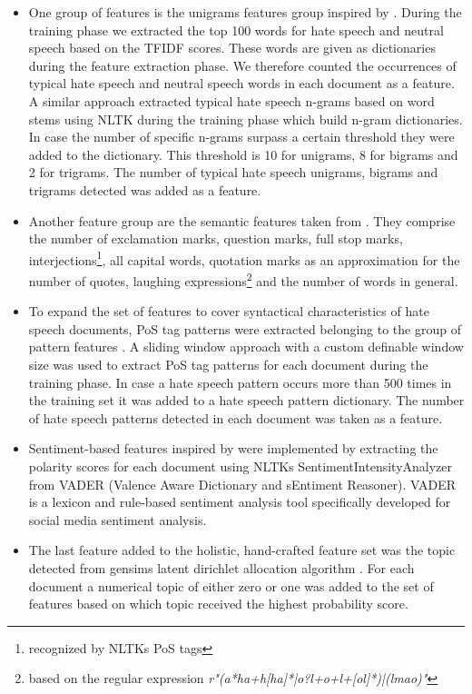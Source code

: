 \begin{itemize}
	\item One group of features is the unigrams features group inspired by \cite{ThomasDavidson2020, Oriola.2020, Fortuna2018, Gaydhani2018, Malmasi2017}. During the training phase we extracted the top 100 words for hate speech and neutral speech based on the TFIDF scores. These words are given as dictionaries during the feature extraction phase. We therefore counted the occurrences of typical hate speech and neutral speech words in each document as a feature. A similar approach extracted typical hate speech n-grams based on word stems using NLTK during the training phase which build n-gram dictionaries. In case the number of specific n-grams surpass a certain threshold they were added to the dictionary. This threshold is 10 for unigrams, 8 for bigrams and 2 for trigrams. The number of typical hate speech unigrams, bigrams and trigrams detected was added as a feature. 
	
	\item Another feature group are the semantic features taken from \cite{ThomasDavidson2020, Watanabe2018}. They comprise the number of exclamation marks, question marks, full stop marks, interjections\footnote{recognized by NLTKs PoS tags}, all capital words, quotation marks as an approximation for the number of quotes, laughing expressions\footnote{based on the regular expression \textit{r"(a*ha+h[ha]*|o?l+o+l+[ol]*)|(lmao)"}} and the number of words in general. 
	
	\item To expand the set of features to cover syntactical characteristics of hate speech documents, PoS tag patterns were extracted belonging to the group of pattern features \cite{Oriola.2020, Fortuna2018}. A sliding window approach with a custom definable window size was used to extract PoS tag patterns for each document during the training phase. In case a hate speech pattern occurs more than 500 times in the training set it was added to a hate speech pattern dictionary. The number of hate speech patterns detected in each document was taken as a feature.
	
	\item Sentiment-based features inspired by \cite{Oriola.2020, Fortuna2018} were implemented by extracting the polarity scores for each document using NLTKs SentimentIntensityAnalyzer from VADER (Valence Aware Dictionary and sEntiment Reasoner). VADER is a lexicon and rule-based sentiment analysis tool specifically developed for social media sentiment analysis. 
	
	\item The last feature added to the holistic, hand-crafted feature set was the topic detected from gensims latent dirichlet allocation algorithm \cite{Fortuna2018}. For each document a numerical topic of either zero or one was added to the set of features based on which topic received the highest probability score. 
\end{itemize}

